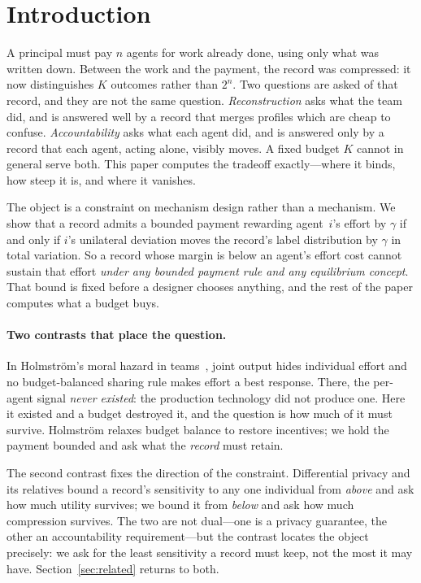 \section{Introduction}
\label{sec:intro}

A principal must pay $n$ agents for work already done, using only what was
written down. Between the work and the payment, the record was compressed: it
now distinguishes $K$ outcomes rather than $2^n$. Two questions are asked of
that record, and they are not the same question. \emph{Reconstruction} asks what
the team did, and is answered well by a record that merges profiles which are
cheap to confuse. \emph{Accountability} asks what each agent did, and is answered
only by a record that each agent, acting alone, visibly moves. A fixed budget $K$
cannot in general serve both. This paper computes the tradeoff exactly---where it
binds, how steep it is, and where it vanishes.

The object is a constraint on mechanism design rather than a mechanism. We show
that a record admits a bounded payment rewarding agent~$i$'s effort by $\gamma$
if and only if $i$'s unilateral deviation moves the record's label distribution
by $\gamma$ in total variation. So a record whose margin is below an agent's
effort cost cannot sustain that effort \emph{under any bounded payment rule and
any equilibrium concept}. That bound is fixed before a designer chooses anything,
and the rest of the paper computes what a budget buys.

\paragraph{Two contrasts that place the question.}
In Holmstr\"om's moral hazard in teams~\cite{holmstrom1982}, joint output hides
individual effort and no budget-balanced sharing rule makes effort a best
response. There, the per-agent signal \emph{never existed}: the production
technology did not produce one. Here it existed and a budget destroyed it, and
the question is how much of it must survive. Holmstr\"om relaxes budget balance
to restore incentives; we hold the payment bounded and ask what the \emph{record}
must retain.

The second contrast fixes the direction of the constraint. Differential privacy
and its relatives bound a record's sensitivity to any one individual from
\emph{above} and ask how much utility survives; we bound it from \emph{below} and
ask how much compression survives. The two are not dual---one is a privacy
guarantee, the other an accountability requirement---but the contrast locates the
object precisely: we ask for the least sensitivity a record must keep, not the
most it may have. Section~\ref{sec:related} returns to both.

